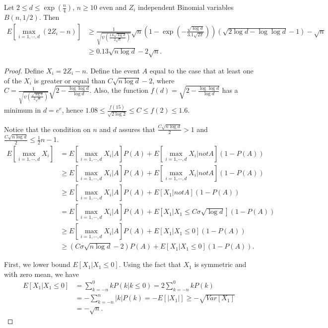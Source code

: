 \documentclass{article} %
\begin{document}
\begin{theorem}
\label{theo:max_bin}
Let $2 \leq d \leq \exp(\frac{n}{4})$, $n\geq 10$ even and $Z_i$ independent Binomial variables $B(n,1/2)$. Then
\begin{align*}
E\left[ \max_{i=1,\cdots,d} (2 Z_i - n)\right]
&\geq \frac{1}{\sqrt{\psi\left(\frac{1.6\sqrt{\log d}}{2 \sqrt{n}}\right)}}\sqrt{n}\left(1 - \exp\left(-\frac{\sqrt{\log d}}{3.1 \sqrt{2\pi}}\right)\right) \left(\sqrt{2 \log d -\log \log d}-1\right) -\sqrt{n} \\
&\geq 0.13 \sqrt{n \log d} - 2 \sqrt{n}.
\end{align*}
\end{theorem}
%
\begin{proof}
Define $X_i= 2 Z_i-n$.
Define the event $A$ equal to the case that at least one of the $X_i$ is greater or equal than $C \sqrt{n \log d}-2$, where $C=\frac{1}{\sqrt{\psi\left(\frac{\sqrt{\log d}}{2 \sqrt{n}}\right)}}\sqrt{2-\frac{\log \log d}{\log d}}$. Also, the function $f(d)=\sqrt{2-\frac{\log \log d}{\log d}}$ has a minimum in $d=e^e$, hence $1.08 \leq \frac{f(15)}{\sqrt{2 \log 2}} \leq C\leq f(2)\leq 1.6$.

Notice that the condition on $n$ and $d$ assures that $\frac{C \sqrt{n \log d}}{2}>1$ and $\frac{C \sqrt{n \log d}}{2}\leq \frac{1}{2} n -1$.
%
\begin{align*}
E[\max_{i=1,\cdots,d} X_i] 
&= E[\max_{i=1,\cdots,d} X_i| A ] P(A) + E[\max_{i=1,\cdots,d} X_i| not A ] (1-P(A)) \\
&\geq E[\max_{i=1,\cdots,d} X_i| A ] P(A) + E[\max_{i=1,\cdots,d} X_i| not A ] (1-P(A))\\
&\geq E[\max_{i=1,\cdots,d} X_i| A ] P(A) + E[X_1| not A ](1-P(A)) \\
&= E[\max_{i=1,\cdots,d} X_i| A ] P(A) + E[X_1| X_1\leq C \sigma \sqrt{\log d}] (1-P(A))\\
&\geq E[\max_{i=1,\cdots,d} X_i| A ] P(A) + E[X_1| X_1\leq 0](1-P(A)) \\
&\geq (C \sigma \sqrt{n \log d} -2) P(A) + E[X_1| X_1\leq 0] (1-P(A)).
\end{align*}

First, we lower bound $E[X_1| X_1\leq 0]$. Using the fact that $X_1$ is symmetric and with zero mean, we have
\begin{align*}
E[X_1| X_1\leq 0] &= \sum_{k=-n}^0 k P(k | k\leq 0) = 2 \sum_{k=-n}^0 k P(k) \\
&= - \sum_{k=-n}^n |k| P(k) = - E[|X_1|] \geq - \sqrt{Var[X_1]}\\
&= -\sqrt{n}.
\end{align*}


\end{proof}
\end{document}
